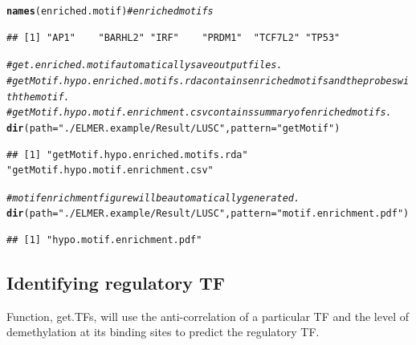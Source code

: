 \documentclass{article}\usepackage[]{graphicx}\usepackage[]{color}
\makeatletter
\newcommand{\hlstr}[1]{\textcolor[rgb]{0.192,0.494,0.8}{#1}}%
\newcommand{\hlcom}[1]{\textcolor[rgb]{0.678,0.584,0.686}{\textit{#1}}}%
\newcommand{\hlstd}[1]{\textcolor[rgb]{0.345,0.345,0.345}{#1}}%
\newcommand{\hlkwc}[1]{\textcolor[rgb]{0.333,0.667,0.333}{#1}}%
\newcommand{\hlkwd}[1]{\textcolor[rgb]{0.737,0.353,0.396}{\textbf{#1}}}%
\newenvironment{kframe}{%
 \def\at@end@of@kframe{}%
 \ifinner\ifhmode%
  \def\at@end@of@kframe{\end{minipage}}%
  \begin{minipage}{\columnwidth}%
 \fi\fi%
 \def\FrameCommand##1{\hskip\@totalleftmargin \hskip-\fboxsep
 \colorbox{shadecolor}{##1}\hskip-\fboxsep
     \hskip-\linewidth \hskip-\@totalleftmargin \hskip\columnwidth}%
 \MakeFramed {\advance\hsize-\width
   \@totalleftmargin\z@ \linewidth\hsize
   \@setminipage}}%
 {\par\unskip\endMakeFramed%
 \at@end@of@kframe}
\newenvironment{knitrout}{}{} %
\makeatother
\begin{document}
\begin{knitrout}
\begin{kframe}
{\ttfamily\noindent\itshape\color{messagecolor}{\#\# 6 motifs are enriched.}}\begin{alltt}
\hlkwd{names}\hlstd{(enriched.motif)}  \hlcom{# enriched motifs}
\end{alltt}
\begin{verbatim}
## [1] "AP1"    "BARHL2" "IRF"    "PRDM1"  "TCF7L2" "TP53"
\end{verbatim}
\begin{alltt}
\hlcom{# get.enriched.motif automatically save output files. }
\hlcom{# getMotif.hypo.enriched.motifs.rda contains enriched motifs and the probes with the motif. }
\hlcom{# getMotif.hypo.motif.enrichment.csv contains summary of enriched motifs.}
\hlkwd{dir}\hlstd{(}\hlkwc{path} \hlstd{=} \hlstr{"./ELMER.example/Result/LUSC"}\hlstd{,} \hlkwc{pattern} \hlstd{=} \hlstr{"getMotif"}\hlstd{)}
\end{alltt}
\begin{verbatim}
## [1] "getMotif.hypo.enriched.motifs.rda"  "getMotif.hypo.motif.enrichment.csv"
\end{verbatim}
\begin{alltt}
\hlcom{# motif enrichment figure will be automatically generated.}
\hlkwd{dir}\hlstd{(}\hlkwc{path} \hlstd{=} \hlstr{"./ELMER.example/Result/LUSC"}\hlstd{,} \hlkwc{pattern} \hlstd{=} \hlstr{"motif.enrichment.pdf"}\hlstd{)}
\end{alltt}
\begin{verbatim}
## [1] "hypo.motif.enrichment.pdf"
\end{verbatim}
\end{kframe}
\end{knitrout}


\subsection{Identifying regulatory TF}
Function, get.TFs, will use the anti-correlation of a particular TF and the level of 
demethylation at its binding sites to predict the regulatory TF.
\end{document}
